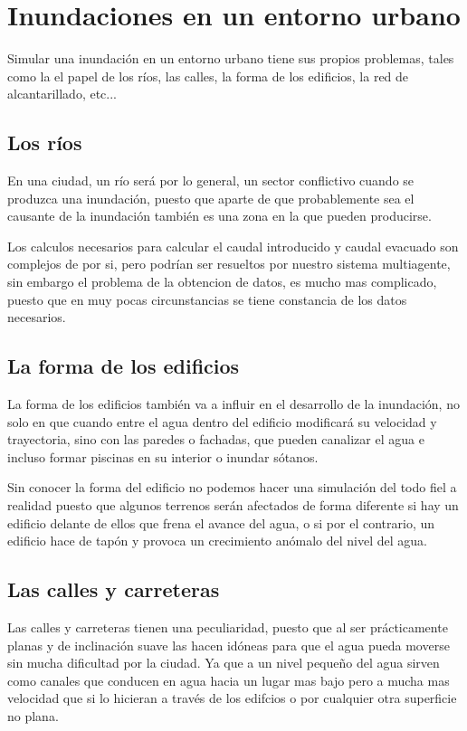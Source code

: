 \section*{Inundaciones en un entorno urbano}

Simular una inundación en un entorno urbano tiene sus propios problemas, tales
como la el papel de los ríos, las calles, la forma de los edificios, la red de
alcantarillado, etc... \cite{simulator}
\subsection*{Los ríos}
En una ciudad, un río será por lo general, un sector conflictivo cuando se
produzca una inundación, puesto que aparte de que probablemente sea el causante
de la inundación  también es una zona en la que pueden producirse.

Los calculos necesarios para calcular el caudal introducido y caudal evacuado
\cite{desvordamiento} son complejos de por si, pero podrían ser resueltos por
nuestro sistema multiagente, sin embargo el problema de la obtencion de datos,
es mucho mas complicado, puesto que en muy pocas circunstancias se tiene
constancia de los datos necesarios.

\subsection*{La forma de los edificios}
La forma de los edificios también va a influir en el desarrollo de la
inundación, no solo en que cuando entre el agua dentro del edificio modificará
su velocidad y trayectoria, sino con las paredes o fachadas, que pueden
canalizar el agua e incluso formar piscinas en su interior o inundar sótanos.

Sin conocer la forma del edificio no podemos hacer una simulación del todo fiel
a realidad puesto que algunos terrenos serán afectados de forma diferente si
hay un edificio delante de ellos que frena el avance del agua, o si por el
contrario, un edificio hace de tapón y provoca un crecimiento anómalo del nivel
del agua.

\subsection*{Las calles y carreteras}
Las calles y carreteras tienen una peculiaridad, puesto que al ser
prácticamente planas y de inclinación suave las hacen idóneas para que el agua
pueda moverse sin mucha dificultad por la ciudad. Ya que a un nivel pequeño del
agua sirven como canales que conducen en agua hacia un lugar mas bajo pero a
mucha mas velocidad que si lo hicieran a través de los edifcios o por cualquier
otra superficie no plana.


